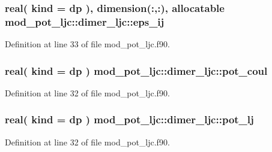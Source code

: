 \subsubsection[{\texorpdfstring{eps\+\_\+ij}{eps_ij}}]{\setlength{\rightskip}{0pt plus 5cm}real( kind = dp ), dimension(\+:,\+:), allocatable mod\+\_\+pot\+\_\+ljc\+::dimer\+\_\+ljc\+::eps\+\_\+ij}\hypertarget{structmod__pot__ljc_1_1dimer__ljc_a0b8a2e1fcfdad2b20d94cf2ff7bf403b}{}\label{structmod__pot__ljc_1_1dimer__ljc_a0b8a2e1fcfdad2b20d94cf2ff7bf403b}


Definition at line 33 of file mod\+\_\+pot\+\_\+ljc.\+f90.

\subsubsection[{\texorpdfstring{pot\+\_\+coul}{pot_coul}}]{\setlength{\rightskip}{0pt plus 5cm}real( kind = dp ) mod\+\_\+pot\+\_\+ljc\+::dimer\+\_\+ljc\+::pot\+\_\+coul}\hypertarget{structmod__pot__ljc_1_1dimer__ljc_ae8cfe31b601f19d7fec86f87c79669b1}{}\label{structmod__pot__ljc_1_1dimer__ljc_ae8cfe31b601f19d7fec86f87c79669b1}


Definition at line 32 of file mod\+\_\+pot\+\_\+ljc.\+f90.

\subsubsection[{\texorpdfstring{pot\+\_\+lj}{pot_lj}}]{\setlength{\rightskip}{0pt plus 5cm}real( kind = dp ) mod\+\_\+pot\+\_\+ljc\+::dimer\+\_\+ljc\+::pot\+\_\+lj}\hypertarget{structmod__pot__ljc_1_1dimer__ljc_aebc58106f2ca84012cc909153736ade3}{}\label{structmod__pot__ljc_1_1dimer__ljc_aebc58106f2ca84012cc909153736ade3}


Definition at line 32 of file mod\+\_\+pot\+\_\+ljc.\+f90.

